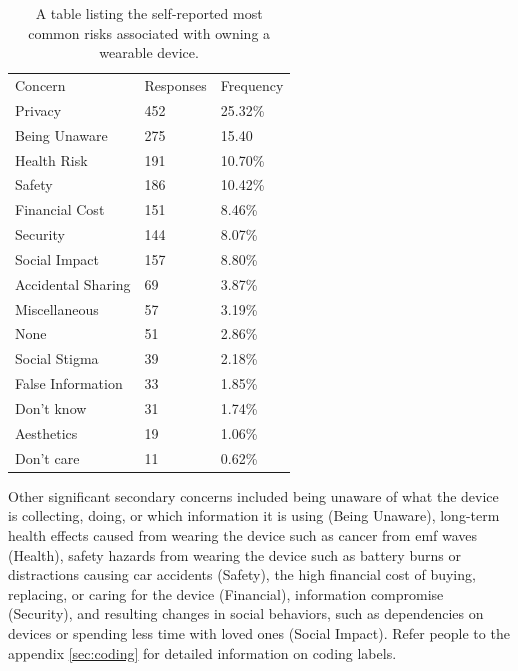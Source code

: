 \documentclass{acm_proc_article-sp}
\begin{document}
\begin{table}[h]
\begin{center}
\begin{tabular}{lll}

Concern &  Responses &  Frequency   \\
Privacy & 452 & 25.32\% \\
Being Unaware & 275 & 15.40\ \\
Health Risk & 191 & 10.70\%\\
Safety & 186 & 10.42\%\\
Financial Cost & 151 & 8.46\%\\
Security &	144 & 8.07\%\\
Social Impact &	157 & 8.80\%\\
Accidental Sharing &	69 & 3.87\%\\
Miscellaneous &	57 & 3.19\%\\
None	& 51 & 2.86\%\\
Social Stigma &	39 & 2.18\%\\
False Information & 33 & 1.85\%\\
Don't know & 31 & 1.74\%\\
Aesthetics 	& 19 & 1.06\%\\
Don't care 	& 11 & 0.62\%\\

\end{tabular}
\caption{A table listing the self-reported most common risks associated with owning a wearable device.}
\label{open-responses}
\end{center}
\end{table}

Other significant secondary concerns included being unaware of what the device is collecting, doing, or which information it is using (Being Unaware), long-term health effects caused from wearing the device such as cancer from emf waves (Health), safety hazards from wearing the device such as battery burns or distractions causing car accidents (Safety), the high financial cost of buying, replacing, or caring for the device (Financial),  information compromise (Security), and resulting changes in social behaviors, such as dependencies on devices or spending less time with loved ones (Social Impact). Refer people to the appendix \ref{sec:coding} for detailed information on coding labels. 
\end{document}
